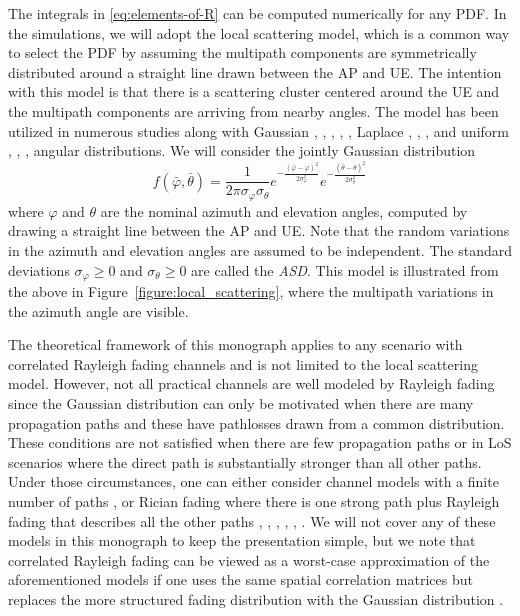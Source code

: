  \enlargethispage{\baselineskip} 

The integrals in \eqref{eq:elements-of-R} can be computed numerically for any \gls{PDF}. In the simulations, we will adopt the local scattering model, which is a common way to select the \gls{PDF} by assuming the multipath components are symmetrically distributed around a straight line drawn between the AP and UE. The intention with this model is that there is a scattering cluster centered around the UE and the multipath components are arriving from nearby angles.
 The model has been utilized in numerous studies along with Gaussian \cite{Adachi1986a},  \cite{massivemimobook}, \cite{Trump1996a}, \cite{Yin2013a}, \cite{Zetterberg1995a}, Laplace \cite{jiang2015achievable}, \cite{Molisch2007}, \cite{Pedersen1997a}, and uniform \cite{Adhikary2013a}, \cite{Salz1994a}, \cite{Shiu2000a}, \cite{Yin2013a} angular distributions.
We will consider the jointly Gaussian distribution
\begin{equation} \label{eq:Gaussian-ASD}
f(\bar{\varphi},\bar{\theta}) = \frac{1}{2\pi \sigma_{\varphi} \sigma_{\theta}} e^{-\frac{(\bar{\varphi} - \varphi)^2}{2 \sigma_{\varphi}^2 }} e^{-\frac{(\bar{\theta} - \theta)^2}{2 \sigma_{\theta}^2 }}
\end{equation}
where $\varphi$ and $\theta$ are the nominal azimuth and elevation angles, computed by drawing a straight line between the AP and UE. 
Note that the random variations in the azimuth and elevation angles are assumed to be independent.
The standard deviations $\sigma_{\varphi}\ge 0$ and $\sigma_{\theta}\ge 0$ are called the \emph{\gls{ASD}}. This model is illustrated from the above in Figure~\ref{figure:local_scattering}, where the multipath variations in the azimuth angle are visible.


\begin{remark}
The theoretical framework of this monograph applies to any scenario with correlated Rayleigh fading channels and is not limited to the local scattering model. However, not all practical channels are well modeled by Rayleigh fading since the Gaussian distribution can only be motivated when there are many propagation paths and these have pathlosses drawn from a common distribution.
These conditions are not satisfied when there are few propagation paths or in LoS scenarios where the direct path is substantially stronger than all other paths.
Under those circumstances, one can either consider channel models with a finite number of paths \cite{Femenias2019a}, \cite{Jin2019a} or Rician fading where there is one strong path plus Rayleigh fading that describes all the other paths
\cite{Alonzo2019a}, \cite{Demir2020b}, \cite{Jin2019a}, \cite{Ngo2018b}, \cite{Ozdogan2019a}, \cite{Zhang2020b}. We will not cover any of these models in this monograph to keep the presentation simple, but we note that correlated Rayleigh fading can be viewed as a worst-case approximation of the aforementioned models if one uses the same spatial correlation matrices but replaces the more structured fading distribution with the Gaussian distribution \cite[Sec.~2.2]{massivemimobook}.
\end{remark}


